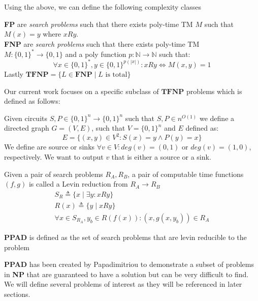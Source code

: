 Using the above, we can define the following complexity classes

\begin{definition}
    \textbf{FP} are \textit{search problems} such that there exists poly-time TM $M$
    such that $M(x) = y$ where $x Ry$.\\
    \textbf{FNP} are \textit{search problems} such that there exists poly-time TM $M: \{0,1\}^* \to \{0,1\}$
    and a poly function $p : \mathbb{N} \to \mathbb{N}$ such that:
    $$
    \forall x \in \{0,1\}^*, y \in \{0,1\}^{p(|x|)}: xRy \iff M(x,y) = 1
    $$
    Lastly $\textbf{TFNP} = \{L \in \textbf{FNP} \mid L \text{ is total}\}$
\end{definition}

Our current work focuses on a specific subclass of $\textbf{TFNP}$ problems
which is defined as follows:

\begin{definition}
    Given circuits $S, P \in \{0,1\}^n \to \{0,1\}^n$ such that $S,P \in n^{O(1)}$
    we define a directed graph $G = (V,E)$, such that $V= \{0,1\}^n$ and $E$ defined as:
    $$
    E = \{(x,y) \in V^2: S(x) = y \wedge P(y) = x\}
    $$
    We define are source or sinks $\forall v \in V: \textit{deg}(v) = (0,1)$ or
    $\textit{deg}(v) = (1,0)$, respectively. We want to output
    $v$ that is either a source or a sink.
\end{definition}


\begin{definition}
    Given a pair of search problems $R_A, R_B$, a pair of
    computable time functions $(f,g)$ is called a Levin reduction from $R_A \to R_B$
    \begin{gather*}
        S_R \triangleq \{x \mid \exists y : xRy  \}\\
        R(x) \triangleq \{y \mid x Ry \} \\
        \forall x \in S_{R_A}, y_b \in R(f(x)):  (x , g(x, y_b)) \in R_A
    \end{gather*}
\end{definition}

\begin{definition}
    \textbf{PPAD} is defined as the set of search problems that
    are levin reducible to the  problem
\end{definition}


\textbf{PPAD} has been created by Papadimitriou \cite{papadimitriou_complexity_1994}
to demonstrate a subset of problems in \textbf{NP} that are guaranteed to have
a solution but can be very difficult to find. We will define
several problems of interest as they will be referenced in later sections.

